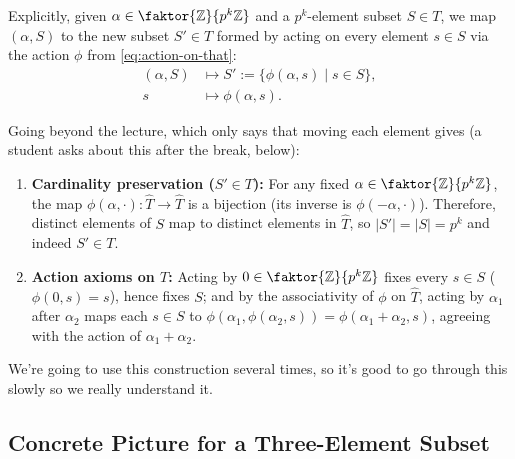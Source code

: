 \begin{proofWrapper}
\begin{content}
Explicitly, given $\alpha \in \faktor{\mathbb{Z}}{p^k\mathbb{Z}}$ and a $p^k$-element subset $S \in T$, we map $(\alpha, S)$ to the new subset $S' \in T$ formed by acting on every element $s \in S$ via the action $\phi$ from \eqref{eq:action-on-that}:
\begin{align}
(\alpha, S) &\longmapsto S' := \{ \phi(\alpha, s) \mid s \in S \}, \nonumber \\
s &\longmapsto \phi(\alpha, s). \label{eq:induced-action-on-t}
\end{align}

\begin{steps}
Going beyond the lecture, which only says that moving each element gives  (a student asks about this after the break, below):
\begin{enumerate}[label=\textbf{\arabic*.}]
    \item \textbf{Cardinality preservation ($S' \in T$):} For any fixed $\alpha \in \faktor{\mathbb{Z}}{p^k\mathbb{Z}}$, the map $\phi(\alpha, \cdot) \colon \widehat{T} \to \widehat{T}$ is a bijection (its inverse is $\phi(-\alpha, \cdot)$). Therefore, distinct elements of $S$ map to distinct elements in $\widehat{T}$, so $|S'| = |S| = p^k$ and indeed $S' \in T$.
    \item \textbf{Action axioms on $T$:} Acting by $0 \in \faktor{\mathbb{Z}}{p^k\mathbb{Z}}$ fixes every $s \in S$ ($\phi(0, s) = s$), hence fixes $S$; and by the associativity of $\phi$ on $\widehat{T}$, acting by $\alpha_1$ after $\alpha_2$ maps each $s \in S$ to $\phi(\alpha_1, \phi(\alpha_2, s)) = \phi(\alpha_1 + \alpha_2, s)$, agreeing with the action of $\alpha_1 + \alpha_2$.
\end{enumerate}
\end{steps}
\end{content}

\begin{speech}[00:36:58 - 00:37:04]
We're going to use this construction several times, so it's good to go through this slowly so we really understand it.
\end{speech}

\subsection{Concrete Picture for a Three-Element Subset}


\end{proofWrapper}

